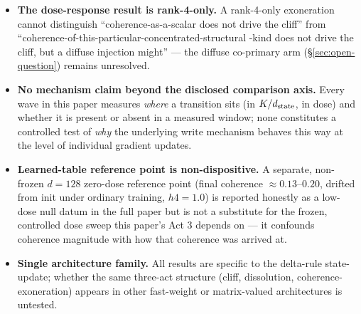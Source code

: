 \begin{itemize}
    independent seeds (already-escalated $n_{\mathrm{iter}}{=}28$) landed
    at DEGENERATE\_CELL: neither cell was admissible, so neither of the
    diagnostic's own adjudication triggers fired. Three findings are
    disclosed as descriptive-only: (a) $K{=}84$ now fails a DIFFERENT
    admission leg (value-salvage $0.093{<}0.10$, otherwise-clean
    convergence) than the original grid's failure mode (convergence
    failing with value-salvage passing) --- the failing leg swapped; (b)
    $K{=}90$ stays fallback-inadmissible even at $n_{\mathrm{iter}}{=}28$,
    showing the admission frontier itself moves with $K/\dstate$ rather
    than being fixed; (c) at this fresh seed $K{=}90$'s own $h4$ measured
    $0.9725$, not the archived exact $1.0000$ --- that specific ceiling
    reading did not replicate --- while $K{=}84$'s own pool-restriction
    shift ($+0.0330$) is $\approx$12$\times$ the measured noise floor
    ($0.0028$), consistent with a real pool-margin effect in direction even
    though the routing correctly refuses to promote an inadmissible cell to
    a finding. The NO-CLIFF-through-$K/\dstate{=}0.9375$ result above
    stands (a claim about the absence of a monotonic decline, not about the
    exact value at $K{=}90$), but its fine structure near the ceiling is
    now known to be instrument-limited rather than settled; the escalation
    is registered for a design-level follow-up, not yet run.
  \item \textbf{The dose-response result is rank-4-only.} A rank-4-only
    exoneration cannot distinguish ``coherence-as-a-scalar does not drive
    the cliff'' from ``coherence-of-this-particular-concentrated-structural
    -kind does not drive the cliff, but a diffuse injection might'' ---
    the diffuse co-primary arm (\S\ref{sec:open-question}) remains
    unresolved.
  \item \textbf{No mechanism claim beyond the disclosed comparison axis.}
    Every wave in this paper measures \emph{where} a transition sits (in
    $K/\dstate$, in dose) and whether it is present or absent in a
    measured window; none constitutes a controlled test of \emph{why} the
    underlying write mechanism behaves this way at the level of individual
    gradient updates.
  \item \textbf{Learned-table reference point is non-dispositive.} A
    separate, non-frozen $d=128$ zero-dose reference point (final
    coherence $\approx\!0.13$--$0.20$, drifted from init under ordinary
    training, $h4=1.0$) is reported honestly as a low-dose null datum in
    the full paper but is not a substitute for the frozen, controlled dose
    sweep this paper's Act 3 depends on --- it confounds coherence
    magnitude with how that coherence was arrived at.
  \item \textbf{Single architecture family.} All results are specific to
    the delta-rule state-update; whether the same three-act structure
    (cliff, dissolution, coherence-exoneration) appears in other
    fast-weight or matrix-valued architectures
    \citep{mishra2026m2rnn, schlag2019tptransformer} is untested.
\end{itemize}
